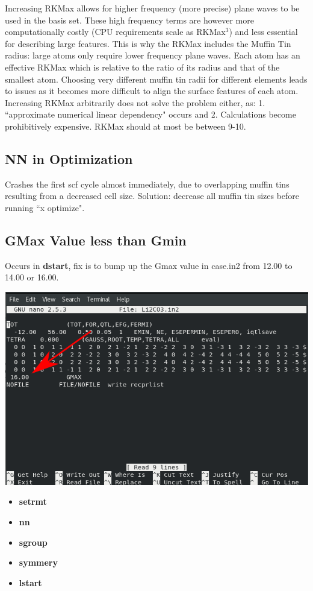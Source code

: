 \documentclass[12pt]{article}
\begin{document}
Increasing RKMax allows for higher frequency (more precise) plane waves to be used in the basis set.  These high frequency terms are however more computationally costly (CPU requirements scale as RKMax$^3$) and less essential for describing large features. This is why the RKMax includes the Muffin Tin radius: large atoms only require lower frequency plane waves.  Each atom has an effective RKMax which  is relative to the ratio of its radius and that of the smallest atom.  Choosing very different muffin tin radii for different elements leads to issues as it becomes more difficult to align the surface features of each atom.  \\

Increasing RKMax arbitrarily does not solve the problem either, as: 1. ``approximate numerical linear dependency" occurs and 2. Calculations become prohibitively expensive.  RKMax should at most be  between 9-10.  


\subsection{NN in Optimization}
Crashes the first scf cycle almost immediately, due to overlapping muffin tins resulting from a decreased cell size.  Solution: decrease all muffin tin sizes before running ``x optimize".


\subsection{GMax Value less than Gmin}

Occurs in \textbf{dstart}, fix is to bump up the Gmax value in case.in2 from 12.00 to 14.00 or 16.00.

\includegraphics[scale=0.5]{./images/gmax_err.png}



\begin{itemize}
	\item \textbf{setrmt}
	\item \textbf{nn}
	\item \textbf{sgroup}
	\item  \textbf{symmery}
	\item \textbf{lstart}
	
\end{itemize}
\end{document}
